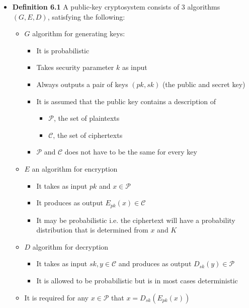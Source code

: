 \begin{itemize}
  \item \textbf{Definition 6.1} A public-key cryptosystem consists of 3 algorithms $(G,E,D)$, satisfying the following:
  \begin{itemize}
  	\item $G$ algorithm for generating keys:
    \begin{itemize}
  		\item It is probabilistic
  		\item Takes security parameter $k$ as input
  		\item Always outputs a pair of keys $(pk,sk)$ (the public and secret key)
  		\item It is assumed that the public key contains a description of
      \begin{itemize}
  			\item $\mathcal P$, the set of plaintexts
  			\item $\mathcal C$, the set of ciphertexts
      \end{itemize}
  		\item $\mathcal P$ and $\mathcal C$ does not have to be the same for every key
    \end{itemize}
  	\item $E$ an algorithm for encryption
    \begin{itemize}
  		\item It takes as input $pk$ and $x \in \mathcal P$
  		\item It produces as output $E_{pk}(x) \in \mathcal C$
  		\item It may be probabilistic i.e. the ciphertext will have a probability distribution that is determined from $x$ and $K$
    \end{itemize}
  	\item $D$ algorithm for decryption
    \begin{itemize}
  		\item It takes as input $sk, y \in \mathcal C$ and produces as output $D_{sk}(y) \in \mathcal P$
  		\item It is allowed to be probabilistic but is in most cases deterministic
    \end{itemize}
  	\item It is required for any $x \in \mathcal P$ that $x = D_{sk}(E_{pk}(x))$
  \end{itemize}
\end{itemize}
